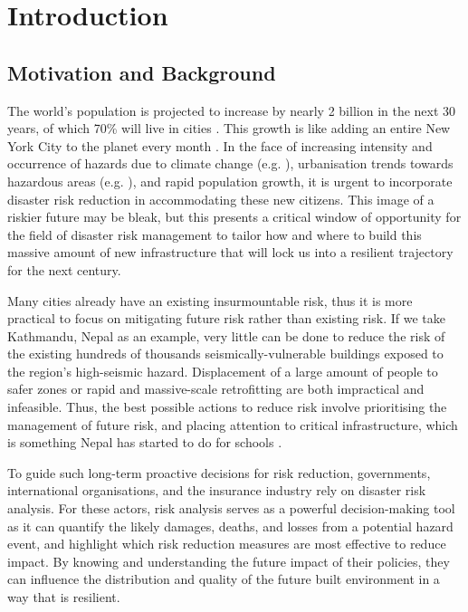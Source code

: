 \chapter[Introduction]{Introduction}\label{chap-intro}

\section{Motivation and Background}

The world’s population is projected to increase by nearly 2 billion in the next 30 years, of which 70\% will live in cities \citep{UNworldpop}. This growth is like adding an entire New York City to the planet every month \citep{unenvi2017}. In the face of increasing intensity and occurrence of hazards due to climate change (e.g. \citet{stewart2015, frangopol2020, IPCC_RN15}), urbanisation trends towards hazardous areas (e.g. \citet{mcgranahan2007rising,small2003global}), and rapid population growth, it is urgent to incorporate disaster risk reduction in accommodating these new citizens. This image of a riskier future may be bleak, but this presents a critical window of opportunity for the field of disaster risk management to tailor how and where to build this massive amount of new infrastructure that will lock us into a resilient trajectory for the next century.

Many cities already have an existing insurmountable risk, thus it is more practical to focus on mitigating future risk rather than existing risk. If we take Kathmandu, Nepal as an example, very little can be done to reduce the risk of the existing hundreds of thousands seismically-vulnerable buildings exposed to the region's high-seismic hazard. Displacement of a large amount of people to safer zones or rapid and massive-scale retrofitting are both impractical and infeasible. Thus, the best possible actions to reduce risk involve prioritising the management of future risk, and placing attention to critical infrastructure, which is something Nepal has started to do for schools \citep{dixit2014public}.

To guide such long-term proactive decisions for risk reduction, governments, international organisations, and the insurance industry rely on disaster risk analysis. For these actors, risk analysis serves as a powerful decision-making tool as it can quantify the likely damages, deaths, and losses from a potential hazard event, and highlight which risk reduction measures are most effective to reduce impact. By knowing and understanding the future impact of their policies, they can influence the distribution and quality of the future built environment in a way that is resilient.

